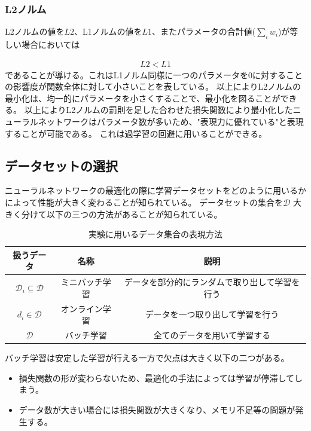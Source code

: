 \subsubsection{L2ノルム}
L2ノルムの値を$ L2 $、L1ノルムの値を$ L1 $、またパラメータの合計値($ \sum_i w_i $)が等しい場合においては

\begin{eqnarray}
L2 < L1
\label{eq:norm uneq}
\end{eqnarray}
であることが導ける。これはL1ノルム同様に一つのパラメータを$ 0 $に対することの影響度が関数全体に対して小さいことを表している。
以上によりL2ノルムの最小化は、均一的にパラメータを小さくすることで、最小化を図ることができる。
以上によりL2ノルムの罰則を足した合わせた損失関数により最小化したニューラルネットワークはパラメータ数が多いため、"表現力に優れている"と表現することが可能である。
これは過学習の回避に用いることができる。


\subsection{データセットの選択}
ニューラルネットワークの最適化の際に学習データセットをどのように用いるかによって性能が大きく変わることが知られている。
データセットの集合を$ \mathcal{D} $ 大きく分けて以下の三つの方法があることが知られている。

\begin{table}[htbp]
    \begin{center}
        \caption{実験に用いるデータ集合の表現方法}
        \vspace{2mm} 
        \begin{tabular}{|c|c|c|}
        \hline
        扱うデータ      & 名称 & 説明 \\
        \hline
        $ \mathcal{D}_i \subseteq \mathcal{D} $          & ミニバッチ学習  & データを部分的にランダムで取り出して学習を行う \\
        \hline
        $ d_i \in \mathcal{D} $                & オンライン学習 & データを一つ取り出して学習を行う  \\
        \hline
        $ \mathcal{D}  $      & バッチ学習 & 全てのデータを用いて学習する \\
        \hline
        \end{tabular}
    \end{center}
\end{table}

バッチ学習は安定した学習が行える一方で欠点は大きく以下の二つがある。

\begin{itemize}
  \item 損失関数の形が変わらないため、最適化の手法によっては学習が停滞してしまう。
  \item データ数が大きい場合には損失関数が大きくなり、メモリ不足等の問題が発生する。
\end{itemize}

